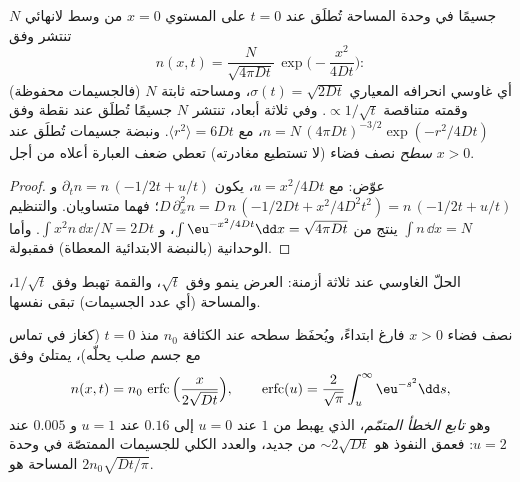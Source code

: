 \begin{proposition}\label{prop:b2:particle-diffusion:gaussian}
$N$ جسيمًا في وحدة المساحة تُطلَق عند $t = 0$ على المستوي $x = 0$ من
وسط لانهائي تنتشر وفق
\[
n(x,t) = \frac{N}{\sqrt{4\pi D t}}\,\exp\Big(-\frac{x^2}{4Dt}\Big) :
\]
أي غاوسي انحرافه المعياري $\sigma(t) = \sqrt{2Dt}$، ومساحته ثابتة
$N$ (فالجسيمات محفوظة) وقمته متناقصة $\propto
1/\sqrt t$. وفي ثلاثة أبعاد، تنتشر $N$ جسيمًا تُطلَق عند نقطة
وفق $n = N\,(4\pi Dt)^{-3/2}\exp(-r^2/4Dt)$، مع $\langle r^2
\rangle = 6Dt$. ونبضة جسيمات تُطلَق عند \emph{سطح}
نصف فضاء (لا تستطيع مغادرته) تعطي ضعف العبارة أعلاه
من أجل $x > 0$.
\end{proposition}

\begin{proof}
عوّض: مع $u = x^2/4Dt$، يكون $\partial_t n = n\,(-1/2t + u/t)$ و
$D\,\partial_x^2 n = D\,n\,(-1/2Dt + x^2/4D^2t^2) = n\,(-1/2t + u/t)$؛
فهما متساويان. والتنظيم $\int n\,\dd x = N$ ينتج من $\int
\eu^{-x^2/4Dt}\dd x = \sqrt{4\pi Dt}$، و $\int x^2 n\,\dd x/N = 2Dt$.
وأما الوحدانية (بالنبضة الابتدائية المعطاة) فمقبولة.
\end{proof}

\begin{omfigure}

{\small الحلّ الغاوسي عند ثلاثة أزمنة: العرض ينمو وفق
$\sqrt t$، والقمة تهبط وفق $1/\sqrt t$، والمساحة (أي عدد
الجسيمات) تبقى نفسها.}
\end{omfigure}

\begin{proposition}\label{prop:b2:particle-diffusion:erfc}
نصف فضاء $x > 0$ فارغ ابتداءً، ويُحفَظ سطحه عند
الكثافة $n_0$ منذ $t = 0$ (كغاز في تماس مع جسم صلب
يحلّه)، يمتلئ وفق
\[
n(x,t) = n_0\,\operatorname{erfc}\Big(\frac{x}{2\sqrt{Dt}}\Big),
\qquad
\operatorname{erfc}(u) = \frac{2}{\sqrt\pi}\int_u^{\infty}\eu^{-s^2}\dd s,
\]
وهو \emph{تابع الخطأ المتمّم}، الذي يهبط من $1$ عند $u =
0$ إلى $0.16$ عند $u = 1$ و $0.005$ عند $u = 2$: فعمق النفوذ
هو $\sim 2\sqrt{Dt}$ من جديد، والعدد الكلي للجسيمات الممتصّة في
وحدة المساحة هو $2n_0\sqrt{Dt/\pi}$.
\end{proposition}

